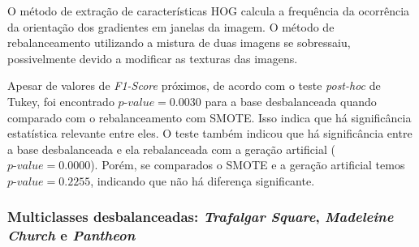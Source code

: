 
O método de extração de características HOG calcula a frequência da ocorrência da orientação dos gradientes em janelas da imagem. O método de rebalanceamento utilizando a mistura de duas imagens se sobressaiu, possivelmente devido a modificar as texturas das imagens.

Apesar de valores de \textit{F1-Score} próximos, de acordo com o teste \textit{post-hoc} de Tukey, foi encontrado $\textit{p-value} = 0.0030$ para a base desbalanceada quando comparado com o rebalanceamento com SMOTE. Isso indica que há significância estatística relevante entre eles. O teste também indicou que há significância entre a base desbalanceada e ela rebalanceada com a geração artificial ($\textit{p-value} = 0.0000$). Porém, se comparados o SMOTE e a geração artificial temos $\textit{p-value} = 0.2255$, indicando que não há diferença significante.

\subsubsection{Multiclasses desbalanceadas: \textit{Trafalgar Square}, \textit{Madeleine Church} e \textit{Pantheon}}

